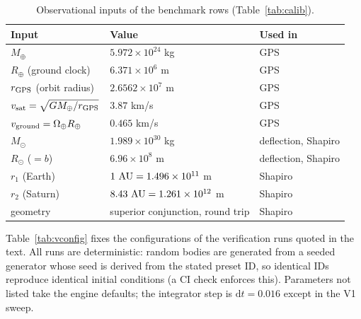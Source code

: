 \documentclass[aps,reprint,amsmath,amssymb,nofootinbib,superscriptaddress,floatfix]{revtex4-2}
\newcommand{\ud}{\mathrm{d}}
\begin{document}
\begin{table}[h]
\caption{\label{tab:inputs}%
Observational inputs of the benchmark rows (Table~\ref{tab:calib}).}
\begin{ruledtabular}
\begin{tabular}{llp{}}
Input & Value & Used in \\
\hline
$M_\oplus$ & $5.972\times10^{24}$ kg & GPS \\
$R_\oplus$ (ground clock) & $6.371\times10^{6}$ m & GPS \\
$r_{\rm GPS}$ (orbit radius) & $2.6562\times10^{7}$ m & GPS \\
$v_{\rm sat} = \sqrt{GM_\oplus/r_{\rm GPS}}$ & $3.87$ km/s & GPS \\
$v_{\rm ground} = \Omega_\oplus R_\oplus$ & $0.465$ km/s & GPS \\
$M_\odot$ & $1.989\times10^{30}$ kg & deflection, Shapiro \\
$R_\odot$ ($=b$) & $6.96\times10^{8}$ m & deflection, Shapiro \\
$r_1$ (Earth) & $1\ {\rm AU} = 1.496\times10^{11}$ m & Shapiro \\
$r_2$ (Saturn) & $8.43\ {\rm AU} = 1.261\times10^{12}$ m & Shapiro \\
geometry & superior conjunction, round trip & Shapiro \\
\end{tabular}
\end{ruledtabular}
\end{table}

Table~\ref{tab:vconfig} fixes the configurations of the verification
runs quoted in the text.
All runs are deterministic: random bodies are generated from a seeded
generator whose seed is derived from the stated preset ID, so
identical IDs reproduce identical initial conditions (a CI check
enforces this).
Parameters not listed take the engine defaults; the integrator step is
$\ud t = 0.016$ except in the V1 sweep.
\end{document}
